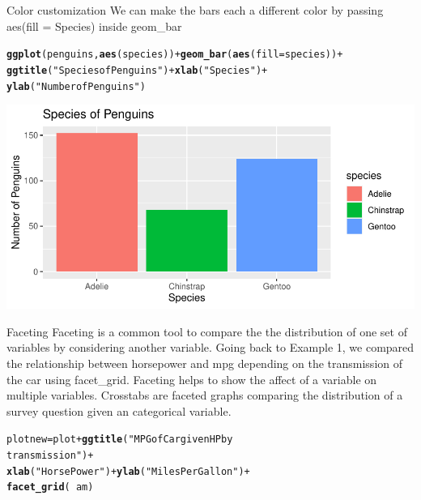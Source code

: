 \documentclass{beamer}\usepackage[]{graphicx}\usepackage[]{color}
\makeatletter
\newcommand{\hlstr}[1]{\textcolor[rgb]{0.192,0.494,0.8}{#1}}%
\newcommand{\hlopt}[1]{\textcolor[rgb]{0,0,0}{#1}}%
\newcommand{\hlstd}[1]{\textcolor[rgb]{0.345,0.345,0.345}{#1}}%
\newcommand{\hlkwb}[1]{\textcolor[rgb]{0.69,0.353,0.396}{#1}}%
\newcommand{\hlkwc}[1]{\textcolor[rgb]{0.333,0.667,0.333}{#1}}%
\newcommand{\hlkwd}[1]{\textcolor[rgb]{0.737,0.353,0.396}{\textbf{#1}}}%
\newenvironment{kframe}{%
 \def\at@end@of@kframe{}%
 \ifinner\ifhmode%
  \def\at@end@of@kframe{\end{minipage}}%
  \begin{minipage}{\columnwidth}%
 \fi\fi%
 \def\FrameCommand##1{\hskip\@totalleftmargin \hskip-\fboxsep
 \colorbox{shadecolor}{##1}\hskip-\fboxsep
     \hskip-\linewidth \hskip-\@totalleftmargin \hskip\columnwidth}%
 \MakeFramed {\advance\hsize-\width
   \@totalleftmargin\z@ \linewidth\hsize
   \@setminipage}}%
 {\par\unskip\endMakeFramed%
 \at@end@of@kframe}
\newenvironment{knitrout}{}{} %
\makeatother
\begin{document}
\begin{frame}[fragile]{Color customization}
We can make the bars each a different color by passing aes(fill = Species) inside geom\_bar
\begin{knitrout}
\color{fgcolor}\begin{kframe}
\begin{alltt}
\hlkwd{ggplot}\hlstd{(penguins,} \hlkwd{aes}\hlstd{(species))} \hlopt{+} \hlkwd{geom_bar}\hlstd{(}\hlkwd{aes}\hlstd{(}\hlkwc{fill} \hlstd{= species))} \hlopt{+}
    \hlkwd{ggtitle}\hlstd{(}\hlstr{"Species of Penguins"}\hlstd{)} \hlopt{+} \hlkwd{xlab}\hlstd{(}\hlstr{"Species"}\hlstd{)} \hlopt{+}
    \hlkwd{ylab}\hlstd{(}\hlstr{"Number of Penguins"}\hlstd{)}
\end{alltt}
\end{kframe}
\includegraphics[width=0.95\linewidth]{figure/unnamed-chunk-13-1} 
\end{knitrout}
\end{frame}


\begin{frame}[fragile]{Faceting}
Faceting is a common tool to compare the the distribution of one set of variables by considering another variable. Going back to Example 1, we compared the relationship between horsepower and mpg depending on the transmission of the car using facet\_grid. Faceting helps to show the affect of a variable on multiple variables.  Crosstabs are faceted graphs comparing the distribution of a survey question given an categorical variable.
\begin{knitrout}
\color{fgcolor}\begin{kframe}
\begin{alltt}
\hlstd{plotnew} \hlkwb{=} \hlstd{plot} \hlopt{+} \hlkwd{ggtitle}\hlstd{(}\hlstr{"MPG of Car given HP by
                         transmission"}\hlstd{)} \hlopt{+}
    \hlkwd{xlab}\hlstd{(}\hlstr{"Horse Power"}\hlstd{)} \hlopt{+} \hlkwd{ylab}\hlstd{(}\hlstr{"Miles Per Gallon"}\hlstd{)} \hlopt{+}
    \hlkwd{facet_grid}\hlstd{(}\hlopt{~}\hlstd{am)}
\end{alltt}
\end{kframe}
\end{knitrout}
\end{frame}
\end{document}
